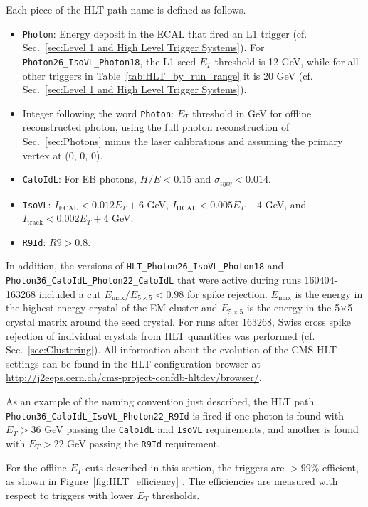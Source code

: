 \documentclass[dissertation.tex]{subfiles}
\begin{document}
Each piece of the HLT path name is defined as follows.

\begin{itemize}
\item \verb+Photon+: Energy deposit in the ECAL that fired an L1 trigger (cf. Sec.~\ref{sec:Level 1 and High Level Trigger Systems}).  For \verb+Photon26_IsoVL_Photon18+, the L1 seed $E_{T}$ threshold is 12 GeV, while for all other triggers in Table~\ref{tab:HLT_by_run_range} it is 20 GeV (cf. Sec.~\ref{sec:Level 1 and High Level Trigger Systems}).
\item Integer following the word \verb+Photon+: $E_{T}$ threshold in GeV for offline reconstructed photon, using the full photon reconstruction of Sec.~\ref{sec:Photons} minus the laser calibrations and assuming the primary vertex at (0, 0, 0).
\item \verb+CaloIdL+: For EB photons, $H/E < 0.15$ and $\sigma_{i\eta i\eta} < 0.014$.
\item \verb+IsoVL+: $I_{\mathrm{ECAL}} < 0.012E_{T} + 6$ GeV, $I_{\mathrm{HCAL}} < 0.005E_{T} + 4$ GeV, and $I_{\mathrm{track}} < 0.002E_{T} + 4$ GeV.
\item \verb+R9Id+: $R9 > 0.8$.
\end{itemize}
%
In addition, the versions of \verb+HLT_Photon26_IsoVL_Photon18+ and \\\verb+Photon36_CaloIdL_Photon22_CaloIdL+ that were active during runs 160404-163268 included a cut $E_{\mathrm{max}}/E_{5\times 5} < 0.98$ for spike rejection.  $E_{\mathrm{max}}$ is the energy in the highest energy crystal of the EM cluster and $E_{5\times 5}$ is the energy in the 5$\times$5 crystal matrix around the seed crystal.  For runs after 163268, Swiss cross spike rejection of individual crystals from HLT quantities was performed (cf. Sec.~\ref{sec:Clustering}).  All information about the evolution of the CMS HLT settings can be found in the HLT configuration browser at \url{http://j2eeps.cern.ch/cms-project-confdb-hltdev/browser/}.

As an example of the naming convention just described, the HLT path \\\verb+Photon36_CaloIdL_IsoVL_Photon22_R9Id+ is fired if one photon is found with $E_{T} > 36$ GeV passing the \verb+CaloIdL+ and \verb+IsoVL+ requirements, and another is found with $E_{T} > 22$ GeV passing the \verb+R9Id+ requirement.

For the offline $E_{T}$ cuts described in this section, the triggers are $>99\%$ efficient, as shown in Figure~\ref{fig:HLT_efficiency} \cite{CMS_AN-2011-515}.  The efficiencies are measured with respect to triggers with lower $E_{T}$ thresholds.
\end{document}
